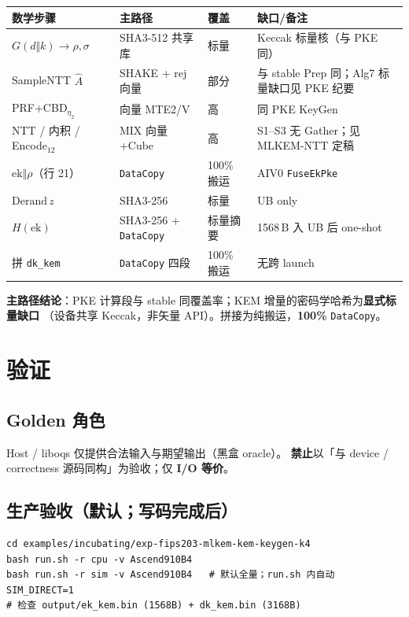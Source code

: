 \documentclass[UTF8,a4paper,11pt]{ctexart}
\begin{document}
\begin{longtable}{@{}L{3.8cm}L{3.6cm}L{1.4cm}L{4.0cm}@{}}
\toprule
数学步骤 & 主路径 & 覆盖 & 缺口/备注 \\
\midrule
$G(d\Vert k)\to\rho,\sigma$ & SHA3-512 共享库 & 标量 & Keccak 标量核（与 PKE 同） \\
SampleNTT $\hat{A}$ & SHAKE + rej 向量 & 部分 & 与 stable Prep 同；Alg7 标量缺口见 PKE 纪要 \\
PRF+CBD$_{\eta_2}$ & 向量 MTE2/V & 高 & 同 PKE KeyGen \\
NTT / 内积 / Encode$_{12}$ & MIX 向量+Cube & 高 & S1--S3 无 Gather；见 MLKEM-NTT 定稿 \\
$\mathrm{ek}\Vert\rho$（行 21） & \texttt{DataCopy} & 100\% 搬运 & AIV0 \texttt{FuseEkPke} \\
$\mathrm{Derand}\,z$ & SHA3-256 & 标量 & UB only \\
$H(\mathrm{ek})$ & SHA3-256 + \texttt{DataCopy} & 标量摘要 & 1568\,B 入 UB 后 one-shot \\
拼 \texttt{dk\_kem} & \texttt{DataCopy} 四段 & 100\% 搬运 & 无跨 launch \\
\bottomrule
\end{longtable}

\textbf{主路径结论}：PKE 计算段与 stable 同覆盖率；KEM 增量的密码学哈希为\textbf{显式标量缺口}
（设备共享 Keccak，非矢量 API）。拼接为纯搬运，\textbf{100\%} \texttt{DataCopy}。

\section{验证}
\label{sec:verify}

\subsection{Golden 角色}

Host / liboqs 仅提供合法输入与期望输出（黑盒 oracle）。
\textbf{禁止}以「与 device / correctness 源码同构」为验收；仅 \textbf{I/O 等价}。

\subsection{生产验收（默认；写码完成后）}

\begin{verbatim}
cd examples/incubating/exp-fips203-mlkem-kem-keygen-k4
bash run.sh -r cpu -v Ascend910B4
bash run.sh -r sim -v Ascend910B4   # 默认全量；run.sh 内自动 SIM_DIRECT=1
# 检查 output/ek_kem.bin (1568B) + dk_kem.bin (3168B)
\end{verbatim}
\end{document}
